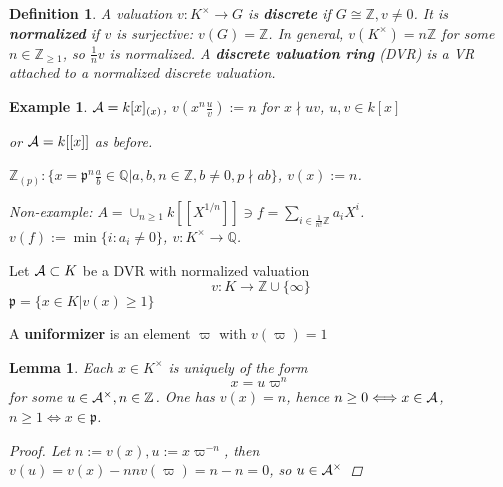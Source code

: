 \documentclass[11pt]{article}
\newtheorem{lemma}[thm]{Lemma}
\newtheorem{dfn}[thm]{Definition}
\newtheorem{ex}[thm]{Example}
\newcommand{\intg}{\mathbb Z}
\newcommand{\ratl}{\mathbb Q}
\newcommand{\scp}{{\mathfrak p}}
\newcommand{\cala}{{\cal A}}
\newcommand{\lrta}{\longrightarrow}
\newcommand{\Llrta}{\Longleftrightarrow}
\begin{document}
\begin{dfn}
A valuation $v:K^\times\lrta G$ is \textbf{discrete} if $G\cong \intg, v\neq 0$. It is \textbf{normalized} if $v$ is surjective: $v(G)=\intg$. In general, $v(K^\times)=n\intg$ for some $n\in \intg_{\geq 1}$, so $\frac{1}{n}v$ is normalized. A \textbf{discrete valuation ring} (DVR) is a VR attached to a normalized discrete valuation.
\end{dfn}

\begin{ex}
$\cala=k[x]_{(x)}$, $v(x^n\frac{u}{v}):=n$ for $x\nmid uv$, $u,v\in k[x]$

or $\cala=k[[x]]$ as before.

$\intg_(p):\{x=\scp^n\frac{a}{b}\in \ratl|a,b,n\in \intg, b\neq 0,p\nmid ab\}$, $v(x):=n$.


Non-example: $A=\cup_{n\geq 1}k[[X^{1/n}]]\ni f=\sum_{i\in \frac{1}{n!}\intg}a_i X^{i}$. $v(f):=\min\{i:a_i\neq 0\}$, $v:K^\times\lrta \ratl$.
\end{ex}

Let $\cala\subset K$ be a DVR with normalized valuation
$$
v:K\lrta \intg\cup \{\infty\}
$$
$\scp=\{x\in K|v(x)\geq 1\}$

A \textbf{uniformizer} is an element $\varpi$ with $v(\varpi)=1$

\begin{lemma}
Each $x\in K^\times$ is uniquely of the form
$$
x=u \varpi^n
$$
for some $u\in \cala^\times, n\in \intg$. One has $v(x)=n$, hence $n\geq 0\Llrta x\in \cala$, $n\geq 1\Llrta x\in \scp$.
\begin{proof}
Let $n:=v(x),u:=x\varpi^{-n}$, then $v(u)=v(x)-nn v(\varpi)=n-n=0$, so $u\in \cala^\times$
\end{proof}
\end{lemma}
\end{document}
